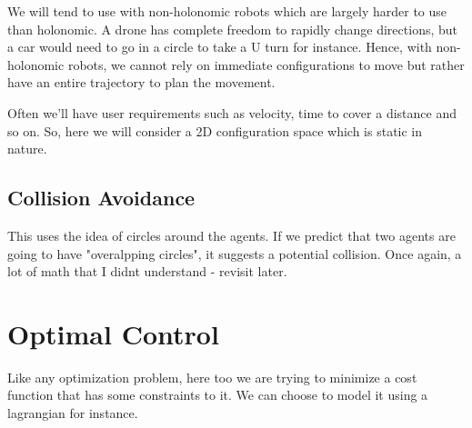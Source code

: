 We will tend to use with non-holonomic robots which are largely harder to use than holonomic. A drone has complete freedom to rapidly change directions, but a car would need to go in a circle to take a U turn for instance. Hence, with non-holonomic robots, we cannot rely on immediate configurations to move but rather have an entire trajectory to plan the movement. 

Often we'll have user requirements such as velocity, time to cover a distance and so on. So, here we will consider a 2D configuration space which is static in nature.

\subsection{Collision Avoidance}

This uses the idea of circles around the agents. If we predict that two agents are going to have "overalpping circles", it suggests a potential collision. Once again, a lot of math that I didnt understand - revisit later.

\section{Optimal Control}

Like any optimization problem, here too we are trying to minimize a cost function that has some constraints to it. We can choose to model it using a lagrangian for instance.
